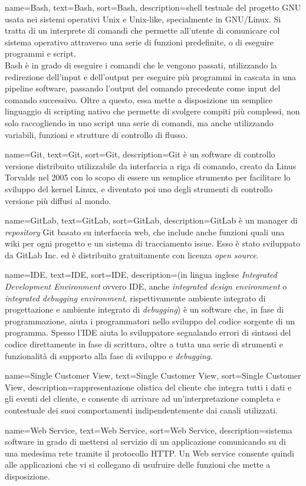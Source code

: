 {
	name=Bash,
	text=Bash,
	sort=Bash,
	description={shell testuale del progetto GNU usata nei sistemi operativi Unix e Unix-like, specialmente in GNU/Linux. Si tratta di un interprete di comandi che permette all'utente di comunicare col sistema operativo attraverso una serie di funzioni predefinite, o di eseguire programmi e script.\\		
	Bash è in grado di eseguire i comandi che le vengono passati, utilizzando la redirezione dell'input e dell'output per eseguire più programmi in cascata in una pipeline software, passando l'output del comando precedente come input del comando successivo.
	Oltre a questo, essa mette a disposizione un semplice linguaggio di scripting nativo che permette di svolgere compiti più complessi, non solo raccogliendo in uno script una serie di comandi, ma anche utilizzando variabili, funzioni e strutture di controllo di flusso.}
}

{
	name=Git,
	text=Git,
	sort=Git,
	description={Git è un software di controllo versione distribuito utilizzabile da interfaccia a riga di comando, creato da Linus Torvalds nel 2005 con lo scopo di essere un semplice strumento per facilitare lo sviluppo del kernel Linux, e diventato poi uno degli strumenti di controllo versione più diffusi al mondo.}
}

{
	name=GitLab,
	text=GitLab,
	sort=GitLab,
	description={GitLab è un manager di \textit{repository} Git basato su interfaccia web, che include anche funzioni quali una wiki per ogni progetto e un sistema di tracciamento issue. Esso è stato sviluppato da GitLab Inc. ed è distribuito gratuitamente con licenza \textit{open source}.}
}

{
	name=IDE,
	text=IDE,
	sort=IDE,
	description={(in lingua inglese \textit{Integrated Development Environment} ovvero IDE, anche \textit{integrated design environment} o \textit{integrated debugging environment}, rispettivamente ambiente integrato di progettazione e ambiente integrato di \textit{debugging}) è un software che, in fase di programmazione, aiuta i programmatori nello sviluppo del codice sorgente di un programma. Spesso l’IDE aiuta lo sviluppatore segnalando errori di sintassi del codice direttamente in fase di scrittura, oltre a tutta una serie di strumenti e funzionalità di supporto alla fase di sviluppo e \textit{debugging}.}
}

{
	name=Single Customer View,
	text=Single Customer View,
	sort=Single Customer View,
	description={rappresentazione olistica del cliente che integra tutti i dati e gli eventi del cliente, e consente di arrivare ad un’interpretazione completa e contestuale dei suoi comportamenti indipendentemente dai canali utilizzati.}
}

{
	name=Web Service,
	text=Web Service,
	sort=Web Service,
	description={sistema software in grado di mettersi al servizio di un applicazione comunicando su di una medesima rete tramite il protocollo HTTP. Un Web service consente quindi alle applicazioni che vi si collegano di usufruire delle funzioni che mette a disposizione.}
}